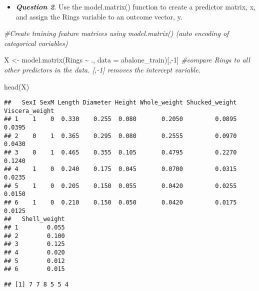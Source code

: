 \documentclass[
]{article}
\newenvironment{Shaded}{\begin{snugshade}}{\end{snugshade}}
\newcommand{\AttributeTok}[1]{\textcolor[rgb]{0.77,0.63,0.00}{#1}}
\newcommand{\CommentTok}[1]{\textcolor[rgb]{0.56,0.35,0.01}{\textit{#1}}}
\newcommand{\DecValTok}[1]{\textcolor[rgb]{0.00,0.00,0.81}{#1}}
\newcommand{\FunctionTok}[1]{\textcolor[rgb]{0.00,0.00,0.00}{#1}}
\newcommand{\NormalTok}[1]{#1}
\newcommand{\OtherTok}[1]{\textcolor[rgb]{0.56,0.35,0.01}{#1}}
\newcommand{\SpecialCharTok}[1]{\textcolor[rgb]{0.00,0.00,0.00}{#1}}
\providecommand{\tightlist}{%
  \setlength{\itemsep}{0pt}\setlength{\parskip}{0pt}}
\begin{document}
\begin{itemize}
\tightlist
\item
  \textbf{\emph{Question 2}}. Use the model.matrix() function to create
  a predictor matrix, x, and assign the Rings variable to an outcome
  vector, y.
\end{itemize}

\begin{Shaded}
\begin{Highlighting}[]
\CommentTok{\#Create training feature matrices using model.matrix() (auto encoding of categorical variables)}

\NormalTok{X }\OtherTok{\textless{}{-}} \FunctionTok{model.matrix}\NormalTok{(Rings }\SpecialCharTok{\textasciitilde{}}\NormalTok{ ., }\AttributeTok{data =}\NormalTok{ abalone\_train)[,}\SpecialCharTok{{-}}\DecValTok{1}\NormalTok{] }\CommentTok{\#compare Rings to all other predictors in the data. [,{-}1] removes the intercept variable.}

\FunctionTok{head}\NormalTok{(X)}
\end{Highlighting}
\end{Shaded}

\begin{verbatim}
##   SexI SexM Length Diameter Height Whole_weight Shucked_weight Viscera_weight
## 1    1    0  0.330    0.255  0.080       0.2050         0.0895         0.0395
## 2    0    1  0.365    0.295  0.080       0.2555         0.0970         0.0430
## 3    0    1  0.465    0.355  0.105       0.4795         0.2270         0.1240
## 4    1    0  0.240    0.175  0.045       0.0700         0.0315         0.0235
## 5    1    0  0.205    0.150  0.055       0.0420         0.0255         0.0150
## 6    1    0  0.210    0.150  0.050       0.0420         0.0175         0.0125
##   Shell_weight
## 1        0.055
## 2        0.100
## 3        0.125
## 4        0.020
## 5        0.012
## 6        0.015
\end{verbatim}

\begin{Shaded}
\end{Shaded}

\begin{verbatim}
## [1] 7 7 8 5 5 4
\end{verbatim}
\end{document}
